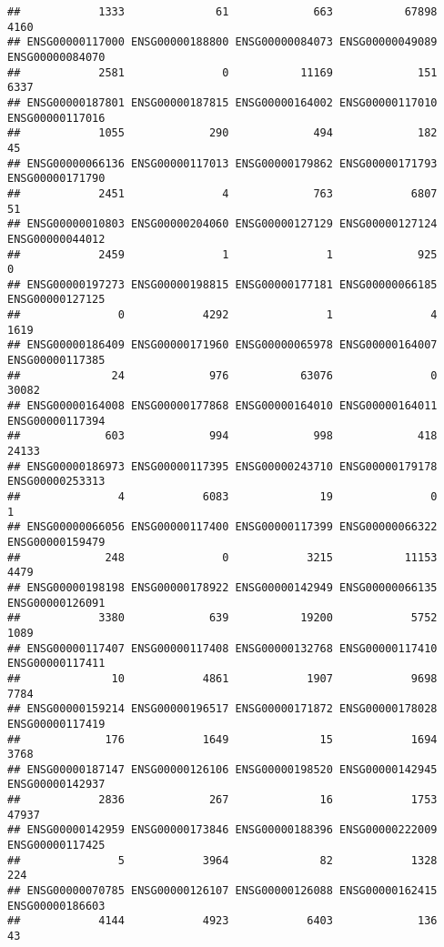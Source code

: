 \documentclass[
]{article}
\begin{document}
\begin{verbatim}
##            1333              61             663           67898            4160 
## ENSG00000117000 ENSG00000188800 ENSG00000084073 ENSG00000049089 ENSG00000084070 
##            2581               0           11169             151            6337 
## ENSG00000187801 ENSG00000187815 ENSG00000164002 ENSG00000117010 ENSG00000117016 
##            1055             290             494             182              45 
## ENSG00000066136 ENSG00000117013 ENSG00000179862 ENSG00000171793 ENSG00000171790 
##            2451               4             763            6807              51 
## ENSG00000010803 ENSG00000204060 ENSG00000127129 ENSG00000127124 ENSG00000044012 
##            2459               1               1             925               0 
## ENSG00000197273 ENSG00000198815 ENSG00000177181 ENSG00000066185 ENSG00000127125 
##               0            4292               1               4            1619 
## ENSG00000186409 ENSG00000171960 ENSG00000065978 ENSG00000164007 ENSG00000117385 
##              24             976           63076               0           30082 
## ENSG00000164008 ENSG00000177868 ENSG00000164010 ENSG00000164011 ENSG00000117394 
##             603             994             998             418           24133 
## ENSG00000186973 ENSG00000117395 ENSG00000243710 ENSG00000179178 ENSG00000253313 
##               4            6083              19               0               1 
## ENSG00000066056 ENSG00000117400 ENSG00000117399 ENSG00000066322 ENSG00000159479 
##             248               0            3215           11153            4479 
## ENSG00000198198 ENSG00000178922 ENSG00000142949 ENSG00000066135 ENSG00000126091 
##            3380             639           19200            5752            1089 
## ENSG00000117407 ENSG00000117408 ENSG00000132768 ENSG00000117410 ENSG00000117411 
##              10            4861            1907            9698            7784 
## ENSG00000159214 ENSG00000196517 ENSG00000171872 ENSG00000178028 ENSG00000117419 
##             176            1649              15            1694            3768 
## ENSG00000187147 ENSG00000126106 ENSG00000198520 ENSG00000142945 ENSG00000142937 
##            2836             267              16            1753           47937 
## ENSG00000142959 ENSG00000173846 ENSG00000188396 ENSG00000222009 ENSG00000117425 
##               5            3964              82            1328             224 
## ENSG00000070785 ENSG00000126107 ENSG00000126088 ENSG00000162415 ENSG00000186603 
##            4144            4923            6403             136              43 

\end{verbatim}
\end{document}
